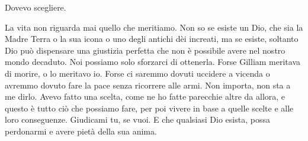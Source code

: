 Dovevo scegliere.

La vita non riguarda mai quello che meritiamo. Non so se esiste un Dio,
che sia la Madre Terra o la sua icona o uno degli antichi dèi increati,
ma se esiste, soltanto Dio può dispensare una giustizia perfetta che non
è possibile avere nel nostro mondo decaduto. Noi possiamo solo sforzarci
di ottenerla. Forse Gilliam meritava di morire, o lo meritavo io. Forse
ci saremmo dovuti uccidere a vicenda o avremmo dovuto fare la pace senza
ricorrere alle armi. Non importa, non sta a me dirlo. Avevo fatto una
scelta, come ne ho fatte parecchie altre da allora, e questo è tutto ciò
che possiamo fare, per poi vivere in base a quelle scelte e alle loro
conseguenze. Giudicami tu, se vuoi. E che qualsiasi Dio esista, possa
perdonarmi e avere pietà della sua anima.


